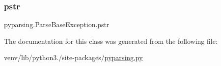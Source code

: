 \subsubsection{\texorpdfstring{pstr}{pstr}}
{\footnotesize\ttfamily pyparsing.\+Parse\+Base\+Exception.\+pstr}



The documentation for this class was generated from the following file\+:\begin{DoxyCompactItemize}
\item 
venv/lib/python3./site-\/packages/\hyperlink{pyparsing_8py}{pyparsing.\+py}\end{DoxyCompactItemize}
